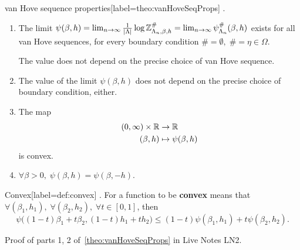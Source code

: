 \documentclass{article}
\begin{document}
\begin{Theorem}{van Hove sequence properties}[label=theo:vanHoveSeqProps]
.  
  \begin{enumerate}
  \item The limit $\psi(\beta, h) = \lim_{n \rightarrow \infty} \frac{1}{\left| \Lambda \right|} \log \mathbb{Z}^{\#}_{\Lambda_n, \beta, h} = \lim_{n \rightarrow \infty} \psi_{\Lambda_n}^{\#}(\beta, h)$ exists for all van Hove sequences, for every boundary condition $\# = \emptyset, \; \# = \eta \in \Omega$.

    The value does not depend on the precise choice of van Hove sequence.
    \item The value of the limit $\psi(\beta, h)$ does not depend on the precise choice of boundary condition, either.
    \item The map 
    \begin{align}
    \label{eq:9}
      (0, \infty) \times \mathbb{R} &\rightarrow \mathbb{R} \\
      (\beta, h) &\mapsto \psi(\beta, h)
    \end{align}
    is convex.
  \item $\forall \beta > 0, \; \psi(\beta, h) = \psi(\beta, -h)$.
  \end{enumerate}
\end{Theorem}

\begin{Definition}{Convex}[label=def:convex]
.  For a function to be \textbf{convex} means that $\forall (\beta_1, h_1), \; \forall (\beta_2, h_2), \; \forall t \in [0, 1]$, then
\begin{equation}
  \psi\Big( (1 - t) \beta_1 + t \beta_2, (1 - t) h_1 + t h_2\Big) \leq (1 - t) \psi(\beta_1, h_1) + t \psi(\beta_2, h_2).
\end{equation}
\end{Definition}

Proof of parts 1, 2 of~\ref{theo:vanHoveSeqProps} in Live Notes LN2.

\printindex
\end{document}

